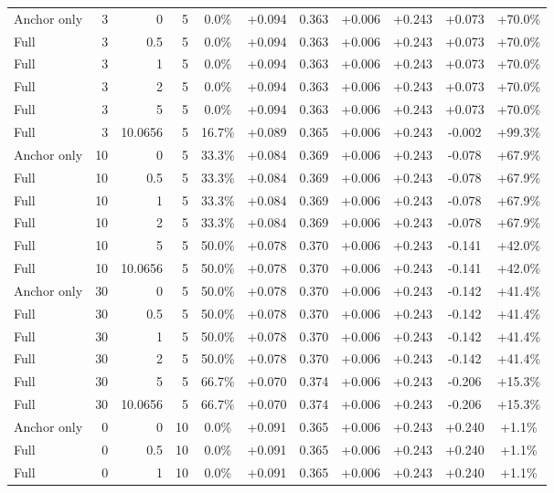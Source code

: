 \begin{table}[htbp]
\begin{tabular}{lrrrccccccc}
Anchor only & 3 & 0 & 5 & 0.0\% & +0.094 & 0.363 & +0.006 & +0.243 & +0.073 & +70.0\% \\
Full & 3 & 0.5 & 5 & 0.0\% & +0.094 & 0.363 & +0.006 & +0.243 & +0.073 & +70.0\% \\
Full & 3 & 1 & 5 & 0.0\% & +0.094 & 0.363 & +0.006 & +0.243 & +0.073 & +70.0\% \\
Full & 3 & 2 & 5 & 0.0\% & +0.094 & 0.363 & +0.006 & +0.243 & +0.073 & +70.0\% \\
Full & 3 & 5 & 5 & 0.0\% & +0.094 & 0.363 & +0.006 & +0.243 & +0.073 & +70.0\% \\
Full & 3 & 10.0656 & 5 & 16.7\% & +0.089 & 0.365 & +0.006 & +0.243 & -0.002 & +99.3\% \\
Anchor only & 10 & 0 & 5 & 33.3\% & +0.084 & 0.369 & +0.006 & +0.243 & -0.078 & +67.9\% \\
Full & 10 & 0.5 & 5 & 33.3\% & +0.084 & 0.369 & +0.006 & +0.243 & -0.078 & +67.9\% \\
Full & 10 & 1 & 5 & 33.3\% & +0.084 & 0.369 & +0.006 & +0.243 & -0.078 & +67.9\% \\
Full & 10 & 2 & 5 & 33.3\% & +0.084 & 0.369 & +0.006 & +0.243 & -0.078 & +67.9\% \\
Full & 10 & 5 & 5 & 50.0\% & +0.078 & 0.370 & +0.006 & +0.243 & -0.141 & +42.0\% \\
Full & 10 & 10.0656 & 5 & 50.0\% & +0.078 & 0.370 & +0.006 & +0.243 & -0.141 & +42.0\% \\
Anchor only & 30 & 0 & 5 & 50.0\% & +0.078 & 0.370 & +0.006 & +0.243 & -0.142 & +41.4\% \\
Full & 30 & 0.5 & 5 & 50.0\% & +0.078 & 0.370 & +0.006 & +0.243 & -0.142 & +41.4\% \\
Full & 30 & 1 & 5 & 50.0\% & +0.078 & 0.370 & +0.006 & +0.243 & -0.142 & +41.4\% \\
Full & 30 & 2 & 5 & 50.0\% & +0.078 & 0.370 & +0.006 & +0.243 & -0.142 & +41.4\% \\
Full & 30 & 5 & 5 & 66.7\% & +0.070 & 0.374 & +0.006 & +0.243 & -0.206 & +15.3\% \\
Full & 30 & 10.0656 & 5 & 66.7\% & +0.070 & 0.374 & +0.006 & +0.243 & -0.206 & +15.3\% \\
Anchor only & 0 & 0 & 10 & 0.0\% & +0.091 & 0.365 & +0.006 & +0.243 & +0.240 & +1.1\% \\
Full & 0 & 0.5 & 10 & 0.0\% & +0.091 & 0.365 & +0.006 & +0.243 & +0.240 & +1.1\% \\
Full & 0 & 1 & 10 & 0.0\% & +0.091 & 0.365 & +0.006 & +0.243 & +0.240 & +1.1\% \\

\end{tabular}
\end{table}
